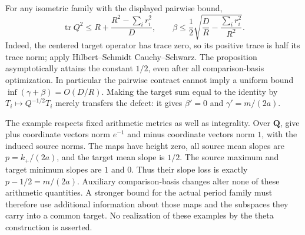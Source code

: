 For any isometric family with the displayed pairwise bound,
\[
 \operatorname{tr}Q^2\le R+\frac{R^2-\sum_i r_i^2}{D},\qquad
 \beta\le\frac12\sqrt{\frac DR-\frac{\sum_i r_i^2}{R^2}}.
\]
Indeed, the centered target operator has trace zero, so its positive
trace is half its trace norm; apply Hilbert--Schmidt Cauchy--Schwarz.
The proposition asymptotically attains the constant $1/2$, even after
all comparison-basis optimization. In particular the pairwise contract
cannot imply a uniform bound $\inf(\gamma+\beta)=O(D/R)$.
Making the target sum equal to the identity by $T_i\mapsto Q^{-1/2}T_i$
merely transfers the defect: it gives $\beta'=0$ and
$\gamma'=m/(2a)$.

The example respects fixed arithmetic metrics as well as integrality.
Over $\mathbf Q$, give plus coordinate vectors norm $e^{-1}$ and minus
coordinate vectors norm $1$, with the induced source norms. The maps
have height zero, all source mean slopes are $p=k_+/(2a)$, and the
target mean slope is $1/2$. The source maximum and target minimum
slopes are $1$ and $0$. Thus their slope loss is exactly
$p-1/2=m/(2a)$. Auxiliary comparison-basis changes alter none of these
arithmetic quantities. A stronger bound for the actual period family
must therefore use additional information about those maps and the
subspaces they carry into a common target. No realization of these
examples by the theta construction is asserted.
